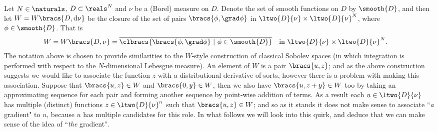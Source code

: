 Let $N\in\naturals$, $D\subset\reals^N$ and $\nu$ be a (Borel) measure on $D$.
Denote the set of smooth functions on $D$ by $\smooth{D}$, and then let $W=W\bracs{D,\mathrm{d}\nu}$ be the closure of the set of pairs $\bracs{\phi,\grad\phi}$ in $\ltwo{D}{\nu}\times\ltwo{D}{\nu}^N$, where $\phi\in\smooth{D}$.
That is
\begin{align*}
	W = W\bracs{D,\nu} &= \overline{\clbracs{\bracs{\phi,\grad\phi} \ \vert \ \phi\in\smooth{D}}} \quad \text{in} \ \ltwo{D}{\nu}\times\ltwo{D}{\nu}^N.
\end{align*}
The notation above is chosen to provide similarities to the $W$-style construction of classical Sobolev spaces (in which integration is performed with respect to the $N$-dimensional Lebesgue measure).
An element of $W$ is a pair $\bracs{u,z}$; and as the above construction suggests we would like to associate the function $z$ with a distributional derivative of sorts, however there is a problem with making this association.
Suppose that $\bracs{u,z}\in W$ and $\bracs{0,y}\in W$, then we also have $\bracs{u,z+y}\in W$ too by taking an approximating sequence for each pair and forming another sequence by point-wise addition of terms.
As a result each $u\in\ltwo{D}{\nu}$ has multiple (distinct) functions $z\in\ltwo{D}{\nu}^n$ such that $\bracs{u,z}\in W$; and so as it stands it does not make sense to associate ``\textit{a} gradient" to $u$, because $u$ has multiple candidates for this role.
In what follows we will look into this quirk, and deduce that we can make sense of the idea of ``\textit{the} gradient". \newline

